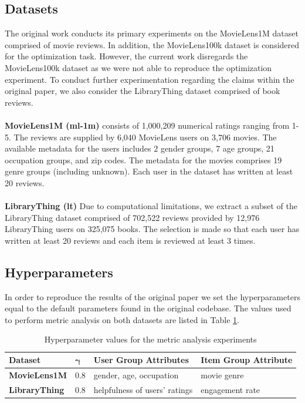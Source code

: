 \subsection{Datasets}
The original work conducts its primary experiments on the MovieLens1M \cite{movielens1m} dataset comprised of movie reviews. In addition, the MovieLens100k dataset is considered for the optimization task. However, the current work disregards the MovieLens100k dataset as we were not able to reproduce the optimization experiment. To conduct further experimentation regarding the claims within the original paper, we also consider the LibraryThing \cite{inproceedings}\cite{inproceedings2} dataset comprised of book reviews. 
\\ \\
\textbf{MovieLens1M (ml-1m)} consists of 1,000,209 numerical ratings ranging from 1-5. The reviews are supplied by 6,040 MovieLens users on 3,706 movies. The available metadata for the users includes 2 gender groups, 7 age groups, 21 occupation groups, and zip codes. The metadata for the movies comprises 19 genre groups (including unknown). Each user in the dataset has written at least 20 reviews. 
\\ \\
\textbf{LibraryThing (lt)} Due to computational limitations, we extract a subset of the LibraryThing dataset comprised of 702,522 reviews provided by 12,976 LibraryThing users on 325,075 books. The selection is made so that each user has written at least 20 reviews and each item is reviewed at least 3 times. 

\subsection{Hyperparameters}
In order to reproduce the results of the original paper we set the hyperparameters equal to the default parameters found in the original codebase. The values used to perform metric analysis on both datasets are listed in Table \ref{hyp}.

\begin{table}[ht]
\centering
\begin{tabular}{ |p{2.2cm}|p{0.5cm}|p{4.5cm}|p{3.3cm}| }
\hline
\hfil\textbf{Dataset} & \hfil$\mathbf{\gamma}$ & \textbf{User Group Attributes} & \textbf{Item Group Attribute}\\ \hline
\textbf{MovieLens1M}&0.8& gender, age, occupation & movie genre\\ \hline
\textbf{LibraryThing}& 0.8& helpfulness of users' ratings & engagement rate\\
\hline
\end{tabular}
\caption{\label{hyp}
Hyperparameter values for the metric analysis experiments}
\end{table}

